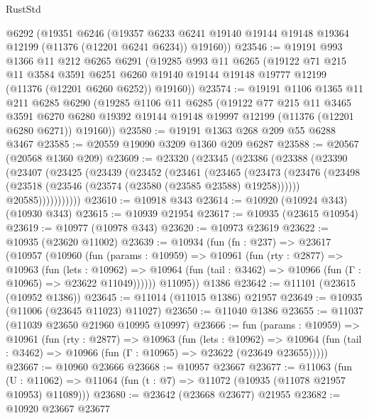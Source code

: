 \begin{lexlean}{RustStd}
\begin{coremodule}
{{{{{{{{{{{{{{{{{{{    @6292
    (@19351
      @6246
      (@19357 @6233 @6241 @19140 @19144 @19148 @19364 @12199 (@11376 (@12201 @6241 @6234)) @19160))
@23546 := @19191
    @993
    @1366
    @11
    @212
    @6265
    @6291
    (@19285
      @993
      @11
      @6265
      (@19122
        @71
        @215
        @11
        @3584
        @3591
        @6251
        @6260
        @19140
        @19144
        @19148
        @19777
        @12199
        (@11376 (@12201 @6260 @6252))
        @19160))
@23574 := @19191
    @1106
    @1365
    @11
    @211
    @6285
    @6290
    (@19285
      @1106
      @11
      @6285
      (@19122
        @77
        @215
        @11
        @3465
        @3591
        @6270
        @6280
        @19392
        @19144
        @19148
        @19997
        @12199
        (@11376 (@12201 @6280 @6271))
        @19160))
@23580 := @19191 @1363 @268 @209 @55 @6288 @3467
@23585 := @20559 @19090 @3209 @1360 @209 @6287
@23588 := @20567 (@20568 @1360 @209)
@23609 := @23320
    (@23345
      (@23386
        (@23388
          (@23390
            (@23407
              (@23425
                (@23439
                  (@23452
                    (@23461
                      (@23465
                        (@23473
                          (@23476
                            (@23498 (@23518 (@23546 (@23574 (@23580 (@23585 @23588) @19258))))))
                          @20585)))))))))))
@23610 := @10918 @343
@23614 := @10920 (@10924 @343) (@10930 @343)
@23615 := @10939 @21954
@23617 := @10935 (@23615 @10954)
@23619 := @10977 (@10978 @343)
@23620 := @10973 @23619
@23622 := @10935 (@23620 @11002)
@23639 := @10934
    (fun (fn : @237) =>
    @23617
      (@10957
        (@10960
          (fun (params : @10959) =>
          @10961
            (fun (rty : @2877) =>
            @10963
              (fun (lets : @10962) =>
              @10964 (fun (tail : @3462) => @10966 (fun (Γ : @10965) => @23622 @11049))))))
        @11095))
    @1386
@23642 := @11101 (@23615 (@10952 @1386))
@23645 := @11014 (@11015 @1386) @21957
@23649 := @10935 (@11006 (@23645 @11023) @11027)
@23650 := @11040 @1386
@23655 := @11037 (@11039 @23650 @21960 @10995 @10997)
@23666 := fun (params : @10959) =>
  @10961
    (fun (rty : @2877) =>
    @10963
      (fun (lets : @10962) =>
      @10964 (fun (tail : @3462) => @10966 (fun (Γ : @10965) => @23622 (@23649 @23655)))))
@23667 := @10960 @23666
@23668 := @10957 @23667
@23677 := @11063
    (fun (U : @11062) => @11064 (fun (t : @7) => @11072 (@10935 (@11078 @21957 @10953) @11089)))
@23680 := @23642 (@23668 @23677) @21955
@23682 := @10920 @23667 @23677
}}}}}}}}}}}}}}}}}}}
\end{coremodule}
\end{lexlean}
